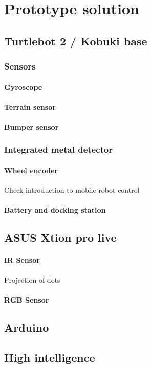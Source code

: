 \chapter{Prototype solution}

\section{Turtlebot 2 / Kobuki base}

\subsection{Sensors}

\subsubsection*{Gyroscope}

\subsubsection*{Terrain sensor}

\subsubsection*{Bumper sensor}

\subsection{Integrated metal detector}

\subsubsection*{Wheel encoder}
Check introduction to mobile robot control

\subsubsection*{Battery and docking station}

\section*{ASUS Xtion pro live}

\subsubsection*{IR Sensor}
Projection of dots

\subsubsection*{RGB Sensor}

\section{Arduino}

\section{High intelligence}




